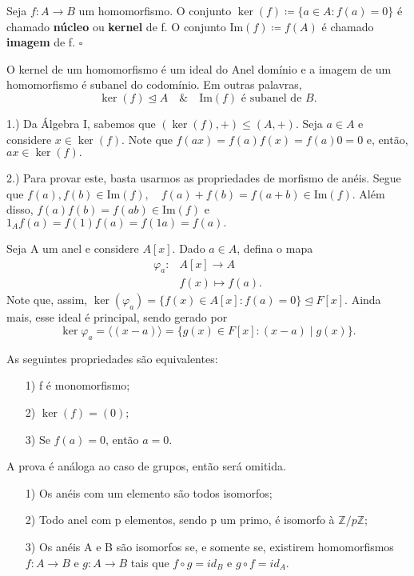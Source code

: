 \documentclass[algebraII_notes.tex]{subfiles}
\begin{document}
\begin{def*}
	Seja \(f:A\rightarrow B\) um homomorfismo. O conjunto \(\ker{(f)}\coloneqq \{a\in A: f(a) = 0\}\)
	é chamado \textbf{núcleo} ou \textbf{kernel} de f. O conjunto \(\mathrm{Im}(f)\coloneqq f(A)\) é chamado
	\textbf{imagem} de f. \(\square\)
\end{def*}
\begin{lemma*}
	O kernel de um homomorfismo é um ideal do Anel domínio e a imagem de um homomorfismo é subanel do codomínio. Em outras palavras,
	\[
		\ker{(f)}\trianglelefteq{A}\quad\&\quad \mathrm{Im}(f)\text{ é subanel de }B.
	\]
\end{lemma*}
\begin{proof*}
	1.) Da Álgebra I, sabemos que \((\ker{(f)}, +)\leq (A, +).\) Seja \(a\in A\) e
	considere \(x\in\ker{(f)}.\) Note que \(f(ax) = f(a)f(x) = f(a)0 = 0\) e, então, \(ax\in\ker{(f)}.\)

	2.) Para provar este, basta usarmos as propriedades de morfismo de anéis. Segue que
	\(f(a), f(b)\in \mathrm{Im}(f),\quad f(a) + f(b) = f(a+b)\in \mathrm{Im}(f).\) Além disso,
	\(f(a)f(b) = f(ab)\in \mathrm{Im}(f)\) e \(1_{A}f(a) = f(1)f(a) = f(1a) = f(a).\) \qedsymbol
\end{proof*}
\begin{example}
	Seja A um anel e considere \(A[x].\) Dado \(a\in A\), defina o mapa
	\begin{align*}
		\varphi_{a}: & A[x]\rightarrow A \\
		             & f(x)\mapsto f(a).
	\end{align*}
	Note que, assim, \(\ker{(\varphi_{a})} = \{f(x)\in A[x]: f(a) = 0\} \trianglelefteq F[x].\) Ainda mais, esse ideal é principal, sendo gerado por
	\[
		\ker{\varphi_{a}} = \langle (x-a) \rangle = \{g(x)\in F[x]: (x-a)\mid g(x)\}.
	\]
\end{example}
\begin{lemma*}
	As seguintes propriedades são equivalentes:
	\begin{itemize}
		\item[1)] f é monomorfismo;
		\item[2)] \(\ker{(f)} = (0);\)
		\item[3)] Se \(f(a) = 0\), então \(a=0.\)
	\end{itemize}
\end{lemma*}
A prova é análoga ao caso de grupos, então será omitida.
\begin{example}[Exercício]
	\begin{itemize}
		\item[1)] Os anéis com um elemento são todos isomorfos;
		\item[2)] Todo anel com p elementos, sendo p um primo, é isomorfo à \(\mathbb{Z}/p \mathbb{Z};\)
		\item[3)] Os anéis A e B são isomorfos se, e somente se, existirem homomorfismos
		      \(f:A\rightarrow B\) e \(g:A\rightarrow B\) tais que \(f\circ{g}=id_{B}\) e \(g\circ{f} = id_{A}.\)
	\end{itemize}
\end{example}
\end{document}
